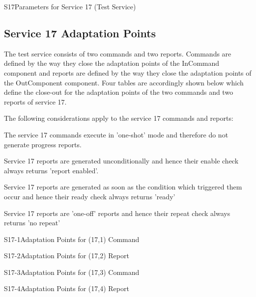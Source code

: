 \documentclass[a4paper,10pt]{article}
\newenvironment{fw_itemize}						%
{\begin{itemize}
  \setlength{\itemsep}{1mm}
  \setlength{\parskip}{0pt}
  \setlength{\parsep}{0pt}}
{\end{itemize}}
\newenvironment{cr_ap}[2]
{
\begin{longtable}{|l|p{4.7cm}|p{6.9cm}|}
\caption{#2}\label{tab:AP-#1} \\
\hline
\rowcolor{light-gray}
\textbf{AP ID} & \textbf{Adaptation Point} & \textbf{Default Value}\\
\hline\hline
\endfirsthead
\rowcolor{light-gray}
\textbf{AP ID} & \textbf{Adaptation Point} & \textbf{Default Value}\\
\hline\hline
\endhead
\DTLforeach*[\DTLiseq{\cat}{#1}]{dbAP}{\cat=Category,\origin=Origin,\id=Id,\ap=AP,\defValue=DefValue}
{\DTLiffirstrow{}{\\\hline}P-\cat-\id & \ap (\origin) & \defValue}\\\hline
}
{\end{longtable}}
\newenvironment{cr_par}[2]
{
\begin{longtable}{|l|p{9.5cm}|}
\caption{#2}\label{tab:Par-#1} \\
\hline
\rowcolor{light-gray}
\textbf{Name} & \textbf{Description}\\
\hline\hline
\endfirsthead
\rowcolor{light-gray}
\textbf{Name} & \textbf{Description}\\
\hline\hline
\endhead
\DTLforeach*[\DTLiseq{\cat}{#1}]{dbPar}{\cat=Category,\name=Name,\desc=Desc}
{\DTLiffirstrow{}{\\\hline}\texttt{\name} & \desc}\\\hline
}
{\end{longtable}}
\begin{document}
\begin{cr_par}{S17}{Parameters for Service 17 (Test Service)}
\end{cr_par}

\subsection{Service 17 Adaptation Points}\label{sec:serv17AP}
The test service consists of two commands and two reports. Commands are defined by the way they close the adaptation points of the InCommand component and reports are defined by the way they close the adaptation points of the OutComponent component. Four tables are accordingly shown below which define the close-out for the adaptation points of the two commands and two reports of service 17.

The following considerations apply to the service 17 commands and reports:

\begin{fw_itemize}
\item The service 17 commands execute in 'one-shot' mode and therefore do not generate progress reports.
\item Service 17 reports are generated unconditionally and hence their enable check always returns 'report enabled'.
\item Service 17 reports are generated as soon as the condition which triggered them occur and hence their ready check always returns 'ready'
\item Service 17 reports are 'one-off' reports and hence their repeat check always returns 'no repeat'
\end{fw_itemize}

\begin{cr_ap}{S17-1}{Adaptation Points for (17,1) Command}
\end{cr_ap}

\begin{cr_ap}{S17-2}{Adaptation Points for (17,2) Report}
\end{cr_ap}

\begin{cr_ap}{S17-3}{Adaptation Points for (17,3) Command}
\end{cr_ap}

\begin{cr_ap}{S17-4}{Adaptation Points for (17,4) Report}
\end{cr_ap}
\end{document}
